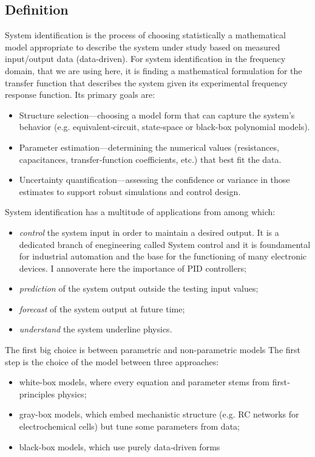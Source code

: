 \subsection{Definition}
System identification is the process of choosing statistically a mathematical model appropriate to describe the system under study based on measured input/output data (data-driven). 
For system identification in the frequency domain, that we are using here, it is finding a mathematical formulation for the transfer function that describes the system given its experimental frequency response function.
Its primary goals are:
\begin{itemize}
\item Structure selection—choosing a model form that can capture the system’s behavior (e.g. equivalent‐circuit, state‐space or black-box polynomial models).
\item Parameter estimation—determining the numerical values (resistances, capacitances, transfer‐function coefficients, etc.) that best fit the data.
\item Uncertainty quantification—assessing the confidence or variance in those estimates to support robust simulations and control design.
\end{itemize}
System identification has a multitude of applications from among which:
\begin{itemize}
    \item \emph{control} the system input in order to maintain a desired output. It is a dedicated branch of enegineering called System control and it is foundamental for industrial automation and the base for the functioning of many electronic devices. I annoverate here the importance of PID controllers;
    \item \emph{prediction} of the system output outside the testing input values;
    \item \emph{forecast} of the system output at future time;
    \item \emph{understand} the system underline physics. 
\end{itemize}
The first big choice is between parametric and non-parametric models
The first step is the choice of the model between three approaches:
\begin{itemize}
    \item white-box models, where every equation and parameter stems from first‐principles physics;
    \item gray-box models, which embed mechanistic structure (e.g. RC networks for electrochemical cells) but tune some parameters from data;
    \item black-box models, which use purely data‐driven forms
\end{itemize}
